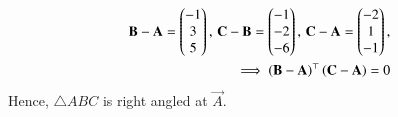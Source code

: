     \begin{align}
         \mathbf{B} - \mathbf{A} = \begin{pmatrix}-1\\3\\5\end{pmatrix},\, 
         \mathbf{C} - \mathbf{B} = \begin{pmatrix}-1\\-2\\-6\end{pmatrix},\,
         \mathbf{C} - \mathbf{A} = \begin{pmatrix}-2\\1\\-1\end{pmatrix},
        \label{eq:chapters/12/10/2/17/dir-vec}
	\\
	    \implies 
	    \left(\mathbf{B} - \mathbf{A}\right)^\top
	    \left(\mathbf{C} - \mathbf{A}\right) = 0
    \end{align}
Hence, $\triangle ABC$ is right angled at $\vec{A}$. 
